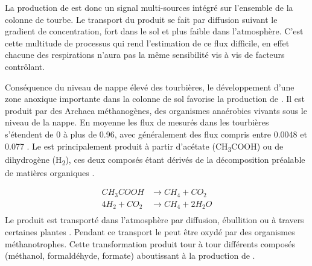 %
La production de \coo est donc un signal multi-sources intégré sur l'ensemble de la colonne de tourbe.
Le transport du \coo produit se fait par diffusion suivant le gradient de concentration, fort dans le sol et plus faible dans l'atmosphère.
C'est cette multitude de processus qui rend l'estimation de ce flux difficile, en effet chacune des respirations n'aura pas la même sensibilité vis à vis de facteurs contrôlant.




Conséquence du niveau de nappe élevé des tourbières, le développement d'une zone anoxique importante dans la colonne de sol favorise la production de \chh.
Il est produit par des Archaea méthanogènes, des organismes anaérobies vivants sous le niveau de la nappe.
En moyenne les flux de \chh mesurés dans les tourbières s'étendent de 0 à plus de \SI{0.96}{\uml}, avec généralement des flux compris entre \num{0.0048} et \SI{0.077}{\uml} \citep{blodau2002}.
Le \chh est principalement produit à partir d'acétate (CH\textsubscript{3}COOH) ou de dihydrogène (H\textsubscript{2}), ces deux composés étant dérivés de la décomposition préalable de matières organiques \citep{lai2009}.

$$\begin{aligned}
CH_{3}COOH  &\rightarrow CH_{4} + CO_{2}\\
4H_{2} + CO_{2} &\rightarrow CH_{4} + 2H_{2}O\\
\end{aligned} $$
Le \chh produit est transporté dans l'atmosphère par diffusion, ébullition ou à travers certaines plantes \citep{joabsson1999,colmer2003}.
Pendant ce transport le \chh peut être oxydé par des organismes méthanotrophes.
Cette transformation produit tour à tour différents composés (méthanol, formaldéhyde, formate) aboutissant à la production de \coo \citep{whalen2005}.

